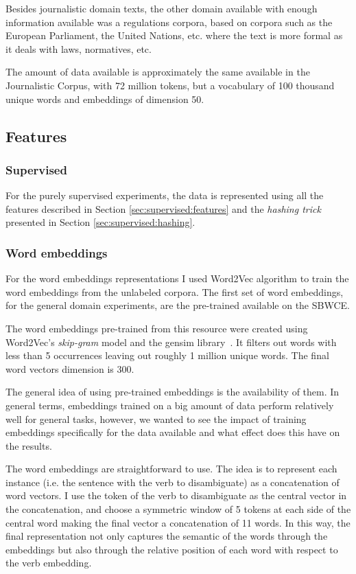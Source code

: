 Besides journalistic domain texts, the other domain available with enough
information available was a regulations corpora, based on corpora such as the
European Parliament, the United Nations, etc. where the text is more formal as
it deals with laws, normatives, etc.

The amount of data available is approximately the same available in the
Journalistic Corpus, with 72 million tokens, but a vocabulary of 100 thousand
unique words and embeddings of dimension 50.

\subsection{Features}\label{sec:embeddings:features}

\subsubsection{Supervised}

For the purely supervised experiments, the data is represented using all the
features described in Section \ref{sec:supervised:features} and the {\em
hashing trick} presented in Section \ref{sec:supervised:hashing}.

\subsubsection{Word embeddings}\label{sec:embeddings:embeddings}

For the word embeddings representations I used Word2Vec algorithm
\cite{Mikolov2013} to train the word embeddings from the unlabeled corpora.
The first set of word embeddings, for the general domain experiments, are the
pre-trained available on the SBWCE.

The word embeddings pre-trained from this resource were created using
Word2Vec's {\em skip-gram} model and the gensim library~\cite{rehurek_lrec}. It
filters out words with less than 5 occurrences leaving out roughly 1 million
unique words. The final word vectors dimension is 300.

The general idea of using pre-trained embeddings is the availability of them.
In general terms, embeddings trained on a big amount of data perform relatively
well for general tasks, however, we wanted to see the impact of training
embeddings specifically for the data available and what effect does this have
on the results.

The word embeddings are straightforward to use. The idea is to represent each
instance (i.e. the sentence with the verb to disambiguate) as a concatenation
of word vectors. I use the token of the verb to disambiguate as the central
vector in the concatenation, and choose a symmetric window of 5 tokens at each
side of the central word making the final vector a concatenation of 11 words.
In this way, the final representation not only captures the semantic of the
words through the embeddings but also through the relative position of each
word with respect to the verb embedding.

